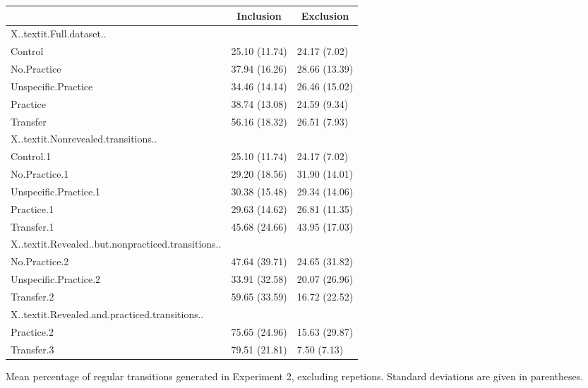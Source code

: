 \documentclass[english,,man]{apa6}
\begin{document}
\begin{appendix}
\begin{table}[hp]
\begin{center}
\begin{threeparttable}
\begin{tabular}{lll}
\toprule
& \multicolumn{1}{c}{Inclusion} & \multicolumn{1}{c}{Exclusion}\\
\midrule
X..textit.Full.dataset.. &  & \\
Control & 25.10 (11.74) & 24.17 (7.02)\\
No.Practice & 37.94 (16.26) & 28.66 (13.39)\\
Unspecific.Practice & 34.46 (14.14) & 26.46 (15.02)\\
Practice & 38.74 (13.08) & 24.59 (9.34)\\
Transfer & 56.16 (18.32) & 26.51 (7.93)\\
X..textit.Nonrevealed.transitions.. &  & \\
Control.1 & 25.10 (11.74) & 24.17 (7.02)\\
No.Practice.1 & 29.20 (18.56) & 31.90 (14.01)\\
Unspecific.Practice.1 & 30.38 (15.48) & 29.34 (14.06)\\
Practice.1 & 29.63 (14.62) & 26.81 (11.35)\\
Transfer.1 & 45.68 (24.66) & 43.95 (17.03)\\
X..textit.Revealed..but.nonpracticed.transitions.. &  & \\
No.Practice.2 & 47.64 (39.71) & 24.65 (31.82)\\
Unspecific.Practice.2 & 33.91 (32.58) & 20.07 (26.96)\\
Transfer.2 & 59.65 (33.59) & 16.72 (22.52)\\
X..textit.Revealed.and.practiced.transitions.. &  & \\
Practice.2 & 75.65 (24.96) & 15.63 (29.87)\\
Transfer.3 & 79.51 (21.81) & 7.50 (7.13)\\
\bottomrule
\end{tabular}

\end{threeparttable}
\end{center}

\end{table}

\begin{table}[hp]

\begin{center}
\begin{threeparttable}

\caption{\label{tab:appendix-pdl7-generation}Mean percentage of regular transitions generated in Experiment 2, excluding repetions. Standard deviations are given in parentheses.}


\end{threeparttable}
\end{center}
\end{table}
\end{appendix}
\end{document}
